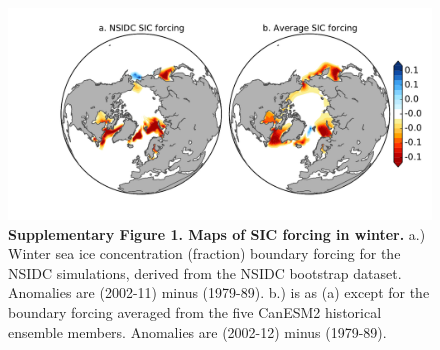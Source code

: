 \documentclass{nature}
\begin{document}
\begin{figure}%
\centering
\noindent\includegraphics[width=30pc]{SuppFigure1.pdf}
\caption{\textbf{Supplementary Figure 1. Maps of SIC forcing in winter.} a.) Winter sea ice concentration (fraction) boundary forcing for the NSIDC simulations, derived from the NSIDC bootstrap dataset. Anomalies are (2002-11) minus (1979-89). b.) is as (a) except for the boundary forcing averaged from the five CanESM2 historical ensemble members. Anomalies are (2002-12) minus (1979-89).
}
\label{fig:supp1} 
\end{figure}


\end{document}
